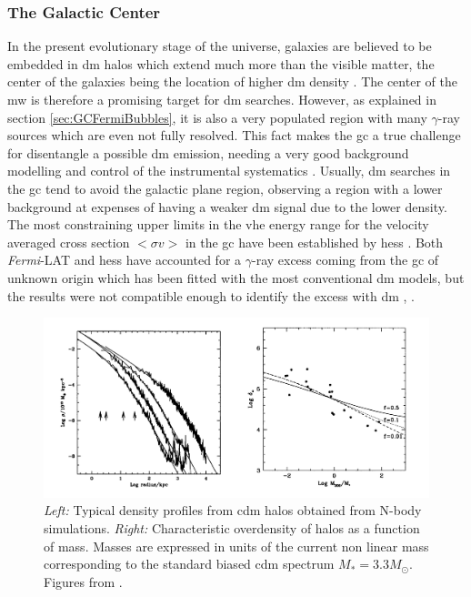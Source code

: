 \documentclass[main.tex]{subfiles}
\begin{document}
\subsubsection{The Galactic Center}

In the present evolutionary stage of the universe, galaxies are believed to be embedded in \gls{dm} halos which extend much more than the visible matter, the center of the galaxies being the location of higher \gls{dm} density \cite{navarro_1996}. The center of the \gls{mw} is therefore a promising target for \gls{dm} searches. However, as explained in section \ref{sec:GCFermiBubbles}, it is also a very populated region with many $\gamma$-ray sources which are even not fully resolved. This fact makes the \gls{gc} a true challenge for disentangle a possible \gls{dm} emission, needing a very good background modelling and control of the instrumental systematics \cite{2019CTAScienceCase}. Usually, \gls{dm} searches in the \gls{gc} tend to avoid the galactic plane region, observing a region with a lower background at expenses of having a weaker \gls{dm} signal due to the lower density.
The most constraining upper limits in the \gls{vhe} energy range for the velocity averaged cross section $<\sigma v>$ in the \gls{gc} have been established by \gls{hess} \cite{2011HESSGClimits}. Both \textit{Fermi}-LAT and \gls{hess} have accounted for a $\gamma$-ray excess coming from the \gls{gc} of unknown origin which has been fitted with the most conventional \gls{dm} models, but the results were not compatible enough to identify the excess with \gls{dm} \cite{2006HESSGCexcess}, \cite{2017FermiGCexcess}.

\begin{figure}[h]
\centering
 \includegraphics[width=1\textwidth]{Pictures/DMhalos.pdf}
  \caption{\textit{Left:} Typical density profiles from \gls{cdm} halos obtained from N-body simulations. \textit{Right:} Characteristic overdensity of halos as a function of mass. Masses are expressed in units of the current non linear mass corresponding to the standard biased \gls{cdm} spectrum $M_{*}=3.3 M_{\odot}$. Figures from \cite{navarro_1996}.}
    \label{fig:DMhalos}
\end{figure}
\end{document}
